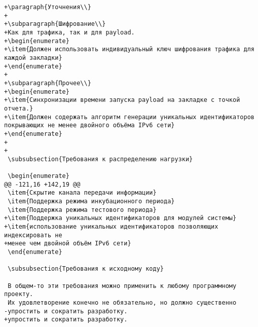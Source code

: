 \begin{verbatim}
+\paragraph{Уточнения\\}
+
+\subparagraph{Шифрование\\}
+Как для трафика, так и для payload.
+\begin{enumerate}
+\item{Должен использовать индивидуальный ключ шифрования трафика для каждой закладки}
+\end{enumerate}
+
+\subparagraph{Прочее\\}
+\begin{enumerate}
+\item{Синхронизации времени запуска payload на закладке с точкой отчета.}
+\item{Должен содержать алгоритм генерации уникальных идентификаторов покрывающих не менее двойного объёма IPv6 сети}
+\end{enumerate}
+
+
 \subsubsection{Требования к распределению нагрузки}

 \begin{enumerate}
@@ -121,16 +142,19 @@
 \item{Скрытие канала передачи информации}
 \item{Поддержка режима инкубационного периода}
 \item{Поддержка режима тестового периода}
+\item{Поддержка уникальных идентификаторов для модулей системы}
+\item{использование уникальных идентификаторов позволяющих индексировать не
+менее чем двойной объём IPv6 сети}
 \end{enumerate}

 \subsubsection{Требования к исходному коду}

 В общем-то эти требования можно применить к любому программному проекту.
 Их удовлетворение конечно не обязательно, но должно существенно
-упростить и сократить разработку.
+упростить и сократить разработку.


\end{verbatim}

